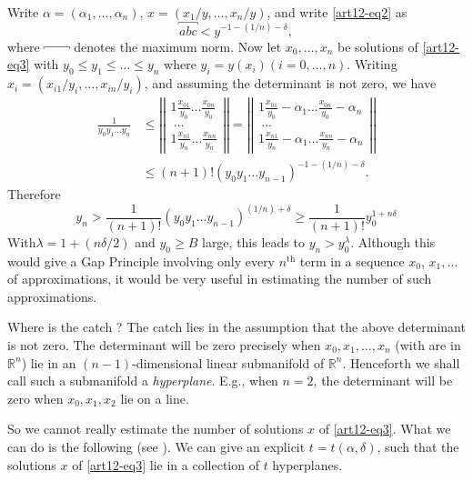 Write $\alpha=(\alpha_{1},\ldots,\alpha_{n})$, $x=(x_{1}/y,\ldots,x_{n}/y)$, and write \eqref{art12-eq2} as
\begin{equation}
\overbracket{abc} < y^{-1-(1/n)-\delta},\label{art12-eq3}
\end{equation}
where $\overbracket{\qquad}$ denotes the maximum norm. Now let $x_{0},\ldots,x_{n}$ be solutions of \eqref{art12-eq3} with $y_{0}\leq y_{1}\leq \ldots\leq y_{n}$ where $y_{i}=y(x_{i})(i=0,\ldots,n)$. Writing $x_{i}=(x_{i1}/y_{i},\ldots,x_{in}/y_{i})$, and assuming the determinant is not zero, we have
\begin{align*}
\frac{1}{y_{0}y_{1}\ldots y_{n}} &\leq \left|\left| 
\begin{array}{c}
1\frac{x_{01}}{y_{0}}\ldots\frac{x_{0n}}{y_{0}}\\
~\ldots\\
1\frac{x_{n1}}{y_{n}}\ldots\frac{x_{nn}}{y_{n}}
\end{array}
\right|\right|
=
\left|\left|
\begin{array}{c}
1\frac{x_{01}}{y_{0}}-\alpha_{1}\ldots \frac{x_{0n}}{y_{0}}-\alpha_{n}\\
~\ldots\\
1\frac{x_{n1}}{y_{n}}-\alpha_{1}\ldots \frac{x_{nn}}{y_{n}}-\alpha_{n}
\end{array}\right|\right|\\
&\leq (n+1)!(y_{0}y_{1}\ldots y_{n-1})^{-1-(1/n)-\delta}.
\end{align*}
Therefore
$$
y_{n}>\frac{1}{(n+1)!}(y_{0}y_{1}\ldots y_{n-1})^{(1/n)+\delta}\geq \frac{1}{(n+1)!}y_{0}^{1+n\delta}
$$
With\pageoriginale $\lambda=1+(n\delta/2)$ and $y_{0}\geq B$ large, this leads to $y_{n}>y^{\lambda}_{0}$. Although this would give a Gap Principle involving only every $n^{\text{th}}$ term in a sequence $x_{0}$, $x_{1},\ldots$ of approximations, it would be very useful in estimating the number of such approximations.

Where is the catch ? The catch lies in the assumption that the above determinant is not zero. The determinant will be zero precisely when $x_{0},x_{1},\ldots,x_{n}$ (with are in $\mathbb{R}^{n}$) lie in an $(n-1)$-dimensional linear submanifold of $\mathbb{R}^{n}$. Henceforth we shall call such a submanifold a {\em hyperplane}. E.g., when $n=2$, the determinant will be zero when $x_{0},x_{1},x_{2}$ lie on a line.

So we cannot really estimate the number of solutions $x$ of \eqref{art12-eq3}. What we can do is the following (see \cite{art12-key12}). We can give an explicit $t=t(\alpha,\delta)$, such that the solutions $x$ of \eqref{art12-eq3} lie in a collection of $t$ hyperplanes.

